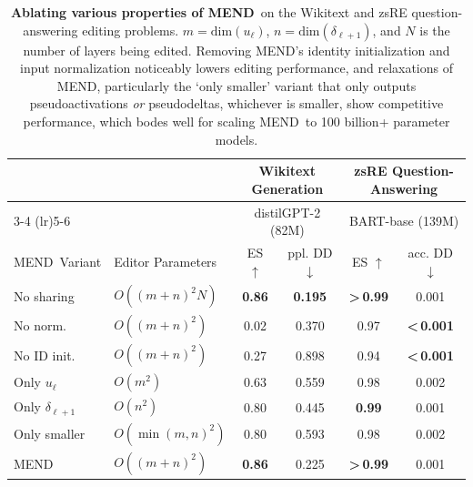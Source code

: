 \documentclass{article}
\makeatletter
\newcommand{\name}{MEND}
\newcommand{\textlt}[1]{\textless\,#1\phantom{\textless\,}}
\newcommand{\textgt}[1]{\textgreater\,#1\phantom{\textgreater\,}}
\let\origsection\section
\renewcommand\section{\@ifstar{\starsection}{\nostarsection}}
\newcommand\nostarsection[1]
{\sectionprelude\origsection{#1}\sectionpostlude}
\newcommand\starsection[1]
{\sectionprelude\origsection*{#1}\sectionpostlude}
\newcommand\sectionprelude{%
  \vspace{-1.5mm}
}
\newcommand\sectionpostlude{%
  \vspace{-2mm}
}
\makeatother
\begin{document}
\begin{table}
    \centering
    \small
    \begin{tabular}{llcccc}
        \toprule
        && \multicolumn{2}{c}{\textbf{Wikitext Generation}} & \multicolumn{2}{c}{\textbf{zsRE Question-Answering}} \\
        \cmidrule(lr){3-4} \cmidrule(lr){5-6}
        && \multicolumn{2}{c}{distilGPT-2 (82M)} & \multicolumn{2}{c}{BART-base (139M)} \\
        \midrule
        \name~Variant & Editor Parameters & ES $\uparrow$ & ppl. DD $\downarrow$ & ES $\uparrow$ & acc. DD $\downarrow$ \\
        \midrule
        No sharing & $O((m+n)^2N)$        & \textbf{0.86} & \textbf{0.195} & \textbf{\textgt{0.99}} & 0.001\\
        No norm. & $O((m+n)^2)$           & 0.02 & 0.370 & 0.97 & \textbf{\textlt{0.001}} \\
        No ID init. & $O((m+n)^2)$        & 0.27 & 0.898 & 0.94 & \textbf{\textlt{0.001}} \\
        Only $u_\ell$ & $O(m^2)$          & 0.63 & 0.559 & 0.98 & 0.002 \\
        Only $\delta_{\ell+1}$ & $O(n^2)$ & 0.80 & 0.445 & \textbf{0.99} & 0.001 \\
        Only smaller & $O(\min(m,n)^2)$   & 0.80 & 0.593 & 0.98 & 0.002 \\
        \midrule
        \name & $O((m+n)^2)$              & \textbf{0.86} & {0.225} & \textbf{\textgt{0.99}} & 0.001 \\
        \bottomrule
    \end{tabular}\caption{\textbf{Ablating various properties of \name}~on the Wikitext and zsRE question-answering editing problems. $m = \text{dim}(u_\ell)$, $n = \text{dim}(\delta_{\ell+1})$, and $N$ is the number of layers being edited. Removing \name's identity initialization and input normalization noticeably lowers editing performance, and relaxations of \name, particularly the `only smaller' variant that only outputs pseudoactivations \textit{or} pseudodeltas, whichever is smaller, show competitive performance, which bodes well for scaling \name~to 100 billion+ parameter models.}
  \label{tab:ablations}
\end{table}



\section{Discussion}
\end{document}
